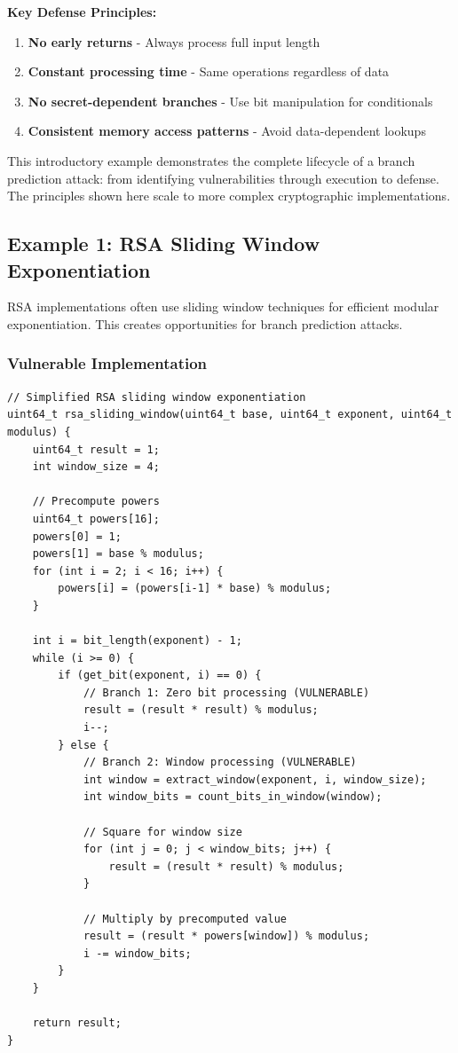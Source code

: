 \documentclass[11pt,a4paper]{article}
\theoremstyle{definition}
\begin{document}
\textbf{Key Defense Principles:}
\begin{enumerate}
    \item \textbf{No early returns} - Always process full input length
    \item \textbf{Constant processing time} - Same operations regardless of data
    \item \textbf{No secret-dependent branches} - Use bit manipulation for conditionals
    \item \textbf{Consistent memory access patterns} - Avoid data-dependent lookups
\end{enumerate}

This introductory example demonstrates the complete lifecycle of a branch prediction attack: from identifying vulnerabilities through execution to defense. The principles shown here scale to more complex cryptographic implementations.

\subsection{Example 1: RSA Sliding Window Exponentiation}

RSA implementations often use sliding window techniques for efficient modular exponentiation. This creates opportunities for branch prediction attacks.

\subsubsection{Vulnerable Implementation}

\begin{lstlisting}[caption={RSA Sliding Window Implementation (Vulnerable)}]
// Simplified RSA sliding window exponentiation
uint64_t rsa_sliding_window(uint64_t base, uint64_t exponent, uint64_t modulus) {
    uint64_t result = 1;
    int window_size = 4;
    
    // Precompute powers
    uint64_t powers[16];
    powers[0] = 1;
    powers[1] = base % modulus;
    for (int i = 2; i < 16; i++) {
        powers[i] = (powers[i-1] * base) % modulus;
    }
    
    int i = bit_length(exponent) - 1;
    while (i >= 0) {
        if (get_bit(exponent, i) == 0) {
            // Branch 1: Zero bit processing (VULNERABLE)
            result = (result * result) % modulus;
            i--;
        } else {
            // Branch 2: Window processing (VULNERABLE)
            int window = extract_window(exponent, i, window_size);
            int window_bits = count_bits_in_window(window);
            
            // Square for window size
            for (int j = 0; j < window_bits; j++) {
                result = (result * result) % modulus;
            }
            
            // Multiply by precomputed value
            result = (result * powers[window]) % modulus;
            i -= window_bits;
        }
    }
    
    return result;
}
\end{lstlisting}
\end{document}
